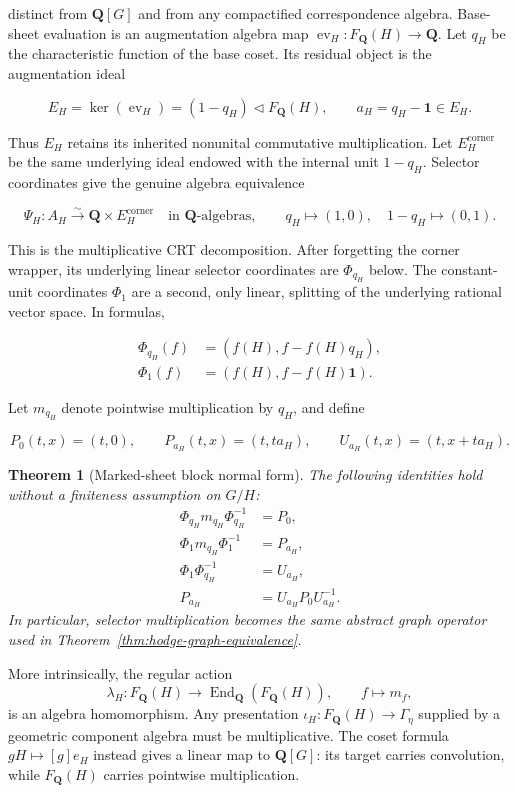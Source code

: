 \documentclass[11pt]{article}
\newtheorem{theorem}{Theorem}[section]
\theoremstyle{definition}
\theoremstyle{remark}
\DeclareMathOperator{\End}{End}
\DeclareMathOperator{\ev}{ev}
\newcommand{\Q}{\mathbf Q}
\newcommand{\one}{\mathbf 1}
\begin{document}
distinct from \(\Q[G]\) and from any compactified correspondence algebra.
Base-sheet evaluation is an augmentation algebra map
\(\ev_H:F_{\Q}(H)\to\Q\).  Let \(q_H\) be the characteristic function of
the base coset.  Its residual object is the augmentation ideal

\[
  E_H=\ker(\ev_H)=(1-q_H)\triangleleft F_{\Q}(H),
  \qquad a_H=q_H-\one\in E_H.
\]

Thus \(E_H\) retains its inherited nonunital commutative multiplication.  Let
\(E_H^{\mathrm{corner}}\) be the same underlying ideal endowed with the
internal unit \(1-q_H\).  Selector coordinates give the genuine algebra
equivalence

\[
  \Psi_H:A_H\overset{\sim}{\longrightarrow}
  \Q\times E_H^{\mathrm{corner}}
  \quad\text{in }\Q\text{-algebras},
  \qquad q_H\longmapsto(1,0),\quad
  1-q_H\longmapsto(0,1).
\]

This is the multiplicative CRT decomposition.  After forgetting the corner
wrapper, its underlying linear selector coordinates are \(\Phi_{q_H}\)
below.  The constant-unit coordinates \(\Phi_1\) are a second, only linear,
splitting of the underlying rational vector space.  In formulas,

\begin{align*}
  \Phi_{q_H}(f)&=(f(H),f-f(H)q_H),\\
  \Phi_1(f)&=(f(H),f-f(H)\one).
\end{align*}

Let \(m_{q_H}\) denote pointwise multiplication by \(q_H\), and define

\[
  P_0(t,x)=(t,0),\qquad
  P_{a_H}(t,x)=(t,ta_H),\qquad
  U_{a_H}(t,x)=(t,x+ta_H).
\]

\begin{theorem}[Marked-sheet block normal form]
\label{thm:block}
The following identities hold without a finiteness assumption on \(G/H\):
\begin{align*}
  \Phi_{q_H}m_{q_H}\Phi_{q_H}^{-1}&=P_0,\\
  \Phi_1m_{q_H}\Phi_1^{-1}&=P_{a_H},\\
  \Phi_1\Phi_{q_H}^{-1}&=U_{a_H},\\
  P_{a_H}&=U_{a_H}P_0U_{a_H}^{-1}.
\end{align*}
In particular, selector multiplication becomes the same abstract graph
operator used in Theorem~\ref{thm:hodge-graph-equivalence}.
\end{theorem}

More intrinsically, the regular action
\[
  \lambda_H:F_{\Q}(H)\longrightarrow
  \End_{\Q}(F_{\Q}(H)),\qquad f\longmapsto m_f,
\]
is an algebra homomorphism.  Any presentation
\(\iota_H:F_{\Q}(H)\to\Gamma_\eta\) supplied by a geometric component
algebra must be multiplicative.  The coset formula \(gH\mapsto[g]e_H\) instead gives a linear map to
\(\Q[G]\): its target carries convolution, while \(F_{\Q}(H)\) carries
pointwise multiplication.
\end{document}
